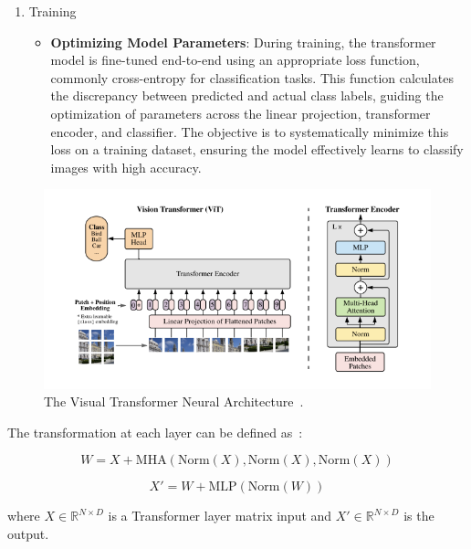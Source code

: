 \documentclass[12pt,a4paper]{report}
\begin{document}
\begin{enumerate}
  \item Training
        \begin{itemize}
          \item \textbf{Optimizing Model Parameters}: During training, the transformer model is fine-tuned end-to-end using an appropriate loss function, commonly cross-entropy for classification tasks. This function calculates the discrepancy between predicted and actual class labels, guiding the optimization of parameters across the linear projection, transformer encoder, and classifier. The objective is to systematically minimize this loss on a training dataset, ensuring the model effectively learns to classify images with high accuracy.
        \end{itemize}
\end{enumerate}

\begin{figure}[th]
  \centering
  \includegraphics[scale=0.8]{./pics/vit.png}
  \caption[The Visual Transformer Neural Architecture]{The Visual Transformer Neural Architecture~\cite{vaswani2017attention, dosovitskiy2020}.}
  \label{fig:p8}
\end{figure}

The transformation at each layer can be defined as~\cite{Comajoan_Cara_2024}:

\begin{equation}
  W = X + \text{MHA}(\text{Norm}(X), \text{Norm}(X), \text{Norm}(X))
\end{equation}

\begin{equation}
  X' = W + \text{MLP}(\text{Norm}(W))
\end{equation}

where \( X \in \mathbb{R}^{N \times D} \) is a Transformer layer matrix input and  \( X' \in \mathbb{R}^{N \times D} \) is the output.
\end{document}
